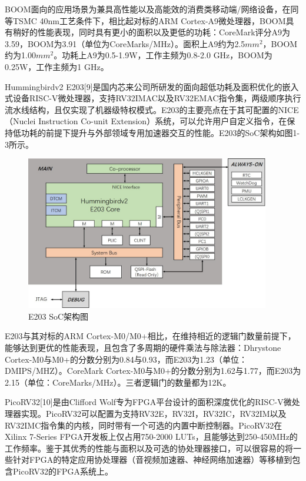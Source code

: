 BOOM面向的应用场景为兼具高性能以及高能效的消费类移动端/网络设备，在同等TSMC 40nm工艺条件下，相比起对标的ARM Cortex-A9微处理器，BOOM具有稍好的性能表现，同时具有更小的面积以及更低的功耗：CoreMark评分A9为3.59，BOOM为3.91（单位为CoreMarks/MHz）。面积上A9约为2.5$mm^2$，BOOM约为1.00$mm^2$。功耗上A9为0.5-1.9W，工作主频为0.8-2.0 GHz，BOOM为0.25W，工作主频为1 GHz。

Hummingbirdv2 E203[9]是国内芯来公司所研发的面向超低功耗及面积优化的嵌入式设备RISC-V微处理器，支持RV32IMAC以及RV32EMAC指令集，两级顺序执行流水线结构，且仅实现了机器级特权模式。E203的主要亮点在于其可配置的NICE（Nuclei Instruction Co-unit Extension）系统，可以允许用户自定义指令，在保持低功耗的前提下提升与外部领域专用加速器交互的性能。E203的SoC架构如图1-3所示。

\begin{figure}[htbp]
	\centering
	\includegraphics[width=0.95\textwidth]{Photos/hbirdv2_soc.jpeg}
	\caption{E203 SoC架构图}
\end{figure}

E203与其对标的ARM Cortex-M0/M0+相比，在维持相近的逻辑门数量前提下，能够达到更优的性能表现，且包含了多周期的硬件乘法与除法器：Dhrystone Cortex-M0与M0+的分数分别为0.84与0.93，而E203为1.23（单位：DMIPS/MHZ）。CoreMark Cortex-M0与M0+的分数分别为1.62与1.77，而E203为2.15（单位：CoreMarks/MHz）。三者逻辑门的数量都为12K。

PicoRV32[10]是由Clifford Wolf专为FPGA平台设计的面积深度优化的RISC-V微处理器实现。PicoRV32可以配置为支持RV32E，RV32I，RV32IC，RV32IM以及RV32IMC指令集的内核，同时带有一个可选的内置中断控制器。PicoRV32在Xilinx 7-Series FPGA开发板上仅占用750-2000 LUTs，且能够达到250-450MHz的工作频率。鉴于其优秀的性能与面积以及可选的协处理器接口，可以很容易的将一些针对FPGA的特定应用协处理器（音视频加速器、神经网络加速器）等移植到包含PicoRV32的FPGA系统上。

